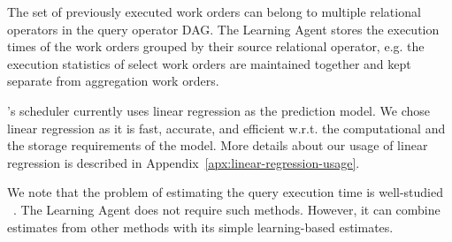 The set of previously executed work orders can belong to multiple relational operators in the query operator DAG. 
The Learning Agent stores the execution times of the work orders grouped by their source relational operator, e.g. the execution statistics of select work orders are maintained together and kept separate from aggregation work orders. 

\sys{}'s scheduler currently uses linear regression as the prediction model.
We chose linear regression as it is fast, accurate, and efficient w.r.t. the computational and the storage requirements of the model. 
More details about our usage of linear regression is described in Appendix~\ref{apx:linear-regression-usage}.

We note that the problem of estimating the query execution time is well-studied 
~\cite{duggan2011performance, wu2013towards, li2012gslpi, 
chaudhuri2004estimating}. 
The Learning Agent does not require such methods. 
However, it can combine estimates from other methods with its simple learning-based estimates.
